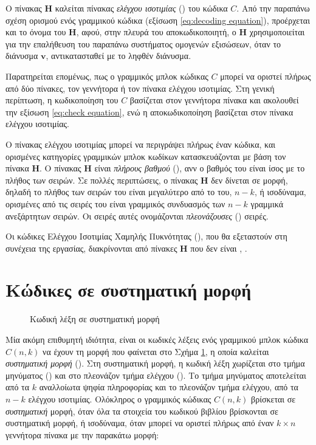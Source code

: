 Ο πίνακας $\mathbf{H}$ καλείται πίνακας \textit{ελέγχου ισοτιμίας} () του κώδικα $C$. Από την παραπάνω σχέση ορισμού ενός γραμμικού κώδικα (εξίσωση \ref{eq:decoding equation}), προέρχεται και το όνομα του $\mathbf{H}$, αφού, στην πλευρά του αποκωδικοποιητή, ο $\mathbf{H}$ χρησιμοποιείται για την επαλήθευση του παραπάνω συστήματος ομογενών εξισώσεων, όταν το διάνυσμα $\mathbf{v}$, αντικατασταθεί με το ληφθέν διάνυσμα.

Παρατηρείται επομένως, πως ο γραμμικός μπλοκ κώδικας $C$ μπορεί να οριστεί πλήρως από δύο πίνακες, τον γεννήτορα ή τον πίνακα ελέγχου ισοτιμίας. Στη γενική περίπτωση, η κωδικοποίηση του $C$ βασίζεται στον γεννήτορα πίνακα και ακολουθεί την εξίσωση \ref{eq:check equation}, ενώ η αποκωδικοποίηση βασίζεται στον πίνακα ελέγχου ισοτιμίας.

Ο πίνακας ελέγχου ισοτιμίας μπορεί να περιγράψει πλήρως έναν κώδικα, και ορισμένες κατηγορίες γραμμικών μπλοκ κωδίκων κατασκευάζονται με βάση τον πίνακα $\mathbf{H}$. Ο πίνακας $\mathbf{H}$ είναι \textit{πλήρους βαθμού} (), ανν ο βαθμός του είναι ίσος με το πλήθος των σειρών. Σε πολλές περιπτώσεις, ο πίνακας $\mathbf{H}$ δεν δίνεται σε  μορφή, δηλαδή το πλήθος των σειρών του είναι μεγαλύτερο από το  του, $n-k$, ή ισοδύναμα, ορισμένες από τις σειρές του είναι γραμμικός συνδυασμός των $n-k$ γραμμικά ανεξάρτητων σειρών. Οι σειρές αυτές ονομάζονται \textit{πλεονάζουσες} () σειρές. 

Οι κώδικες Ελέγχου Ισοτιμίας Χαμηλής Πυκνότητας (), που θα εξεταστούν στη συνέχεια της εργασίας, διακρίνονται από πίνακες $\mathbf{H}$ που δεν είναι  \cite{cover2012elements}, \cite{ryan2009channel}.

\section{Κώδικες σε συστηματική μορφή}

\begin{figure}[h]
\caption{Κωδική λέξη σε συστηματική μορφή}
\label{fig:systematic form}
\end{figure}

Μία ακόμη επιθυμητή ιδιότητα, είναι οι κωδικές λέξεις ενός γραμμικού μπλοκ κώδικα $C(n,k)$ να έχουν τη μορφή που φαίνεται στο Σχήμα \ref{fig:systematic form}, η οποία καλείται \textit{συστηματική μορφή} (). Στη συστηματική μορφή, η κωδική λέξη χωρίζεται στο τμήμα μηνύματος () και στο πλεονάζον τμήμα ελέγχου (). Το τμήμα μηνύματος αποτελείται από τα $k$ αναλλοίωτα ψηφία πληροφορίας και το πλεονάζον τμήμα ελέγχου, από τα $n-k$  ελέγχου ισοτιμίας. Ολόκληρος ο γραμμικός  κώδικας $C(n,k)$ βρίσκεται σε \textit{συστηματική} μορφή, όταν όλα τα στοιχεία του κωδικού βιβλίου βρίσκονται σε συστηματική μορφή, ή ισοδύναμα, όταν μπορεί να οριστεί πλήρως από έναν $k \times n$ γεννήτορα πίνακα με την παρακάτω μορφή:

